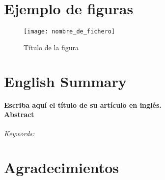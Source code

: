 \documentclass[5p,times,authoryear]{elsarticle}
\begin{document}
\section{Ejemplo de figuras}

\begin{figure}
\centering
  \texttt{[image: nombre\_de\_fichero]}\\
  \caption{Título de la figura}\label{etiqueta_figura}
\end{figure}


\section*{English Summary}

\textbf{Escriba aquí el título de su artículo en inglés.}\\

\noindent \textbf{Abstract}\\


\\

\noindent \emph{Keywords:}\\



\section*{Agradecimientos}









\end{document}
